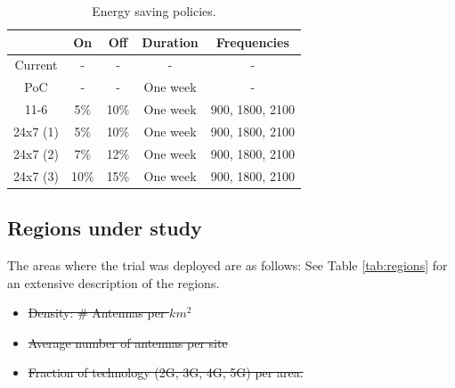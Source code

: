 \begin{table}[]
    \centering
    \begin{tabular}{c c c c c}
        & On & Off & Duration & Frequencies \\
        \hline
         Current & -  & - & - & - \\
         PoC & - & - & One week & - \\
         11-6 & 5\% & 10\% & One week & 900, 1800, 2100 \\ 
         24x7 (1) & 5\%  & 10\% & One week & 900, 1800, 2100 \\ 
         24x7 (2) & 7\%  & 12\% & One week & 900, 1800, 2100\\ 
         24x7 (3) & 10\%  & 15\% & One week & 900, 1800, 2100 \\ 
    \end{tabular}
    \caption{Energy saving policies. }
    \label{tab:my_label}
\end{table}

\subsection{Regions under study}



The areas where the trial was deployed are as follows:
See Table \ref{tab:regions} for an extensive description of the regions.


\begin{itemize}
    \item \st{Density: \# Antennas per $km^2$}
    \item \st{Average number of antennas per site}
    \item \st{Fraction of technology (2G, 3G, 4G, 5G) per area.}
\end{itemize}

